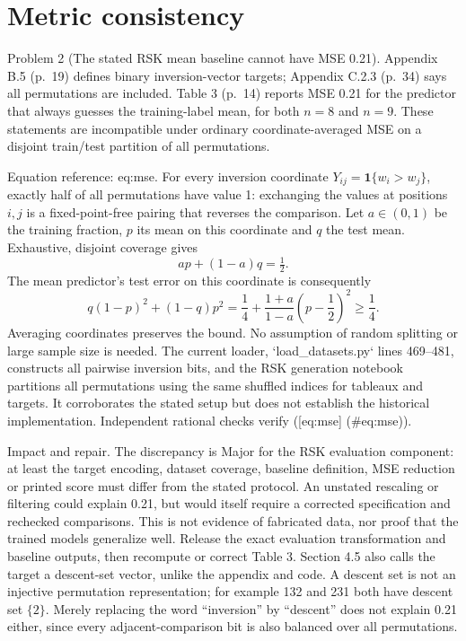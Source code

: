 \documentclass[10pt]{article}
\begin{document}
\section*{Metric consistency}
Problem 2 (The stated RSK mean baseline cannot have MSE 0.21).  Appendix B.5 (p. 19) defines binary inversion-vector targets; Appendix C.2.3 (p. 34) says all permutations are included. Table 3 (p. 14) reports MSE 0.21 for the predictor that always guesses the training-label mean, for both \(n=8\) and \(n=9\). These statements are incompatible under ordinary coordinate-averaged MSE on a disjoint train/test partition of all permutations.\par
Equation reference: eq:mse. For every inversion coordinate \(Y_{ij}=\mathbf1\{w_i>w_j\}\), exactly half of all permutations have value 1: exchanging the values at positions \(i,j\) is a fixed-point-free pairing that reverses the comparison. Let \(a\in(0,1)\) be the training fraction, \(p\) its mean on this coordinate and \(q\) the test mean. Exhaustive, disjoint coverage gives \[ap+(1-a)q=\tfrac12.\] The mean predictor’s test error on this coordinate is consequently \[
 q(1-p)^2+(1-q)p^2
 =\frac14+\frac{1+a}{1-a}\left(p-\frac12\right)^2\ge\frac14.\] Averaging coordinates preserves the bound. No assumption of random splitting or large sample size is needed. The current loader, `load\_datasets.py` lines 469–481, constructs all pairwise inversion bits, and the RSK generation notebook partitions all permutations using the same shuffled indices for tableaux and targets. It corroborates the stated setup but does not establish the historical implementation. Independent rational checks verify ([eq:mse] (\#eq:mse)).\par
Impact and repair. The discrepancy is Major for the RSK evaluation component: at least the target encoding, dataset coverage, baseline definition, MSE reduction or printed score must differ from the stated protocol. An unstated rescaling or filtering could explain 0.21, but would itself require a corrected specification and rechecked comparisons. This is not evidence of fabricated data, nor proof that the trained models generalize well. Release the exact evaluation transformation and baseline outputs, then recompute or correct Table 3. Section 4.5 also calls the target a descent-set vector, unlike the appendix and code. A descent set is not an injective permutation representation; for example 132 and 231 both have descent set \(\{2\}\). Merely replacing the word “inversion” by “descent” does not explain 0.21 either, since every adjacent-comparison bit is also balanced over all permutations.\par
\end{document}
